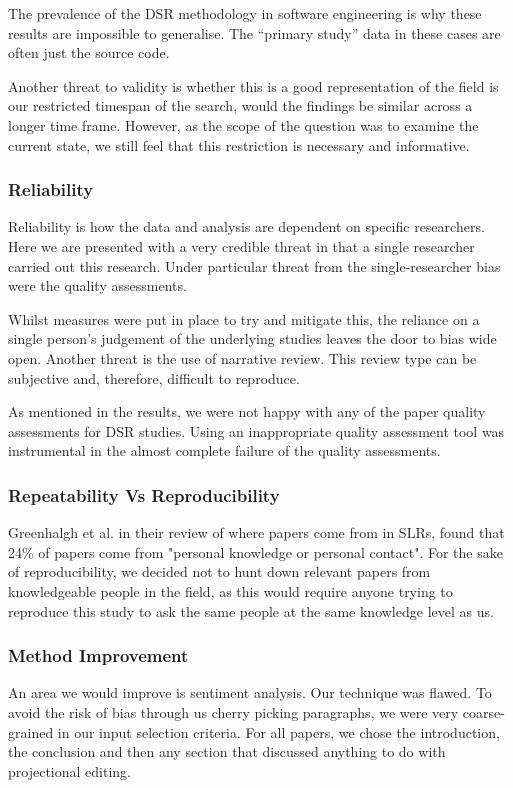 The prevalence of the DSR methodology in software engineering is why these results are impossible to generalise.
The ``primary study'' data in these cases are often just the source code.

Another threat to validity is whether this is a good representation of the field is our restricted timespan of the search, would the findings be similar across a longer time frame.
However, as the scope of the question was to examine the current state, we still feel that this restriction is necessary and informative.

\subsubsection{Reliability}
Reliability is how the data and analysis are dependent on specific researchers.
Here we are presented with a very credible threat in that a single researcher carried out this research.
Under particular threat from the single-researcher bias were the quality assessments. 

Whilst measures were put in place to try and mitigate this, the reliance on a single person's judgement of the underlying studies leaves the door to bias wide open.
Another threat is the use of narrative review. 
This review type can be subjective and, therefore, difficult to reproduce.

As mentioned in the results, we were not happy with any of the paper quality assessments for DSR studies.
Using an inappropriate quality assessment tool was instrumental in the almost complete failure of the quality assessments.


\subsubsection{Repeatability Vs Reproducibility}
Greenhalgh et al.\cite{GreenhalghTrisha2005Eaeo} in their review of where papers come from in SLRs, found that 24\% of papers come from "personal knowledge or personal contact".
For the sake of reproducibility, we decided not to hunt down relevant papers from knowledgeable people in the field, as this would require anyone trying to reproduce this study to ask the same people at the same knowledge level as us.

\subsubsection{Method Improvement}
An area we would improve is sentiment analysis.
Our technique was flawed.
To avoid the risk of bias through us cherry picking paragraphs, we were very coarse-grained in our input selection criteria.
For all papers, we chose the introduction, the conclusion and then any section that discussed anything to do with projectional editing.

